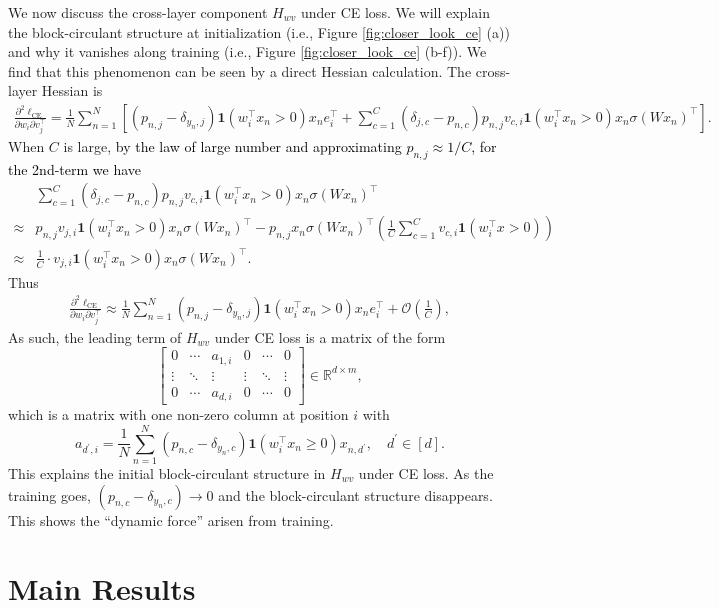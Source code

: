 \documentclass{article}
\newcommand\mf{\mathbf}
\newcommand\tp{\top}
\newcommand{\1}{^{(1)}}
\newcommand{\2}{^{(2)}}
\renewcommand{\l}{\left}
\renewcommand{\r}{\right}
\newcommand{\bea}{\begin{equation}\begin{aligned}}
\newcommand{\eea}{\end{aligned}\end{equation}}
\newcommand{\zhaoruirevise}[1]{\textcolor{black}{ #1}}
\begin{document}
We now discuss the cross-layer component  $H_{wv}$ under CE loss. We will explain the block-circulant structure at initialization (i.e., Figure \ref{fig:closer_look_ce} (a)) and why it vanishes along training (i.e., Figure \ref{fig:closer_look_ce} (b-f)). We find that this phenomenon can be seen by a direct Hessian calculation. The cross-layer Hessian
is
\bea
\frac{\partial^2 \ell_{\text{CE}}}{\partial w_i\partial v_j^\top }=\frac{1}{N}\sum_{n=1}^N\l[(p_{n,j}-\delta_{y_n,j})\mf{1}
(w_i^\top x_n>0)x_n e_i^\top +\sum_{c=1}^C (\delta_{j,c}-p_{n,c})p_{n,j}v_{c,i}\mf{1}(w_i^\top x_n>0)x_n\sigma(Wx_n)^\top\r].\eea
When $C$ is large, \zhaoruirevise{by the law of large number and approximating $p_{n,j}\approx 1/C$, for the 2nd-term we have} 
\bea
&\sum_{c=1}^C (\delta_{j,c}-p_{n,c})p_{n,j}v_{c,i}\mf{1}(w_i^\top x_n>0)x_n\sigma(Wx_n)^\top\\
\approx & p_{n,j} v_{j,i}\mf{1}(w_i^\tp x_n>0) x_n \sigma(Wx_n)^\tp-p_{n,j} x_n \sigma(Wx_n)^\tp \l(\frac{1}{C}\sum_{c=1}^C  v_{c,i}\mf{1}(w_i^\tp x>0)\r)\\
\approx& \frac{1}{C}\cdot  v_{j,i}\mf{1}(w_i^\tp x_n>0) x_n \sigma(Wx_n)^\tp.
\eea
Thus 
\bea
\frac{\partial^2 \ell_{\text{CE}}}{\partial w_i\partial v_j^\top } \approx \frac{1}{N}\sum_{n=1}^N(p_{n,j}-\delta_{y_n,j})\mf{1}
(w_i^\top x_n>0)x_n e_i^\top + \mathcal{O}\left(\frac{1}{C}\right),
\eea
As such, the leading term of $H_{wv}$ under CE loss  is a matrix of the form
\begin{equation}
\label{eq_hwv}
    \left[\begin{array}{cccccc}
0 & \cdots & a_{1, i} & 0 & \cdots & 0 \\
\vdots & \ddots & \vdots & \vdots & \ddots & \vdots \\
0 & \cdots & a_{d, i} & 0 & \cdots & 0
\end{array}\right] \in \mathbb{R}^{d \times m},
\end{equation}
which is a matrix with one non-zero column at position $i$ with {\small $$a_{d^\prime, i}=\frac{1}{N} \sum_{n=1}^N \left(p_{n, c} - \delta_{y_n, c}\right) \mathbf{1}\left(w_i^\top x_n \geq 0\right) x_{n, d^{\prime}},\quad   d^\prime \in [d].$$}   This explains the initial block-circulant structure in $H_{wv}$ under CE loss. As the training goes,   $\left(p_{n, c} - \delta_{y_n, c}\right)\rightarrow 0$ and the block-circulant structure disappears.   This shows the ``dynamic force'' arisen from training.

\section{Main Results}
\end{document}
